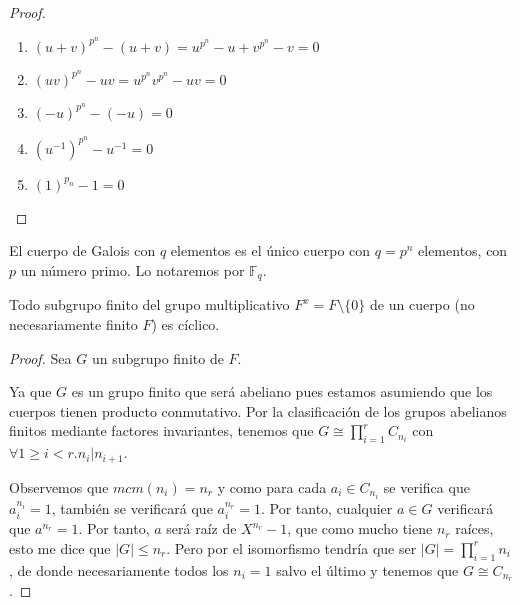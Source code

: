 \begin{proof}
\begin{enumerate}
\item $(u+v)^{p^n} - (u+v) = u^{p^n}-u+v^{p^n}-v = 0$
\item $(uv)^{p^n}-uv = u^{p^n}v^{p^n} - uv = 0$
\item $(-u)^{p^n} - (-u) = 0$
\item $(u^{-1})^{p^n} - u^{-1} = 0$
\item $(1)^{p_n} - 1 = 0$
\end{enumerate}
\end{proof}

\begin{definition}
El cuerpo de Galois con $q$ elementos es el único cuerpo con $q = p^n$ elementos, con $p$ un número primo. Lo notaremos por $\mathbb{F}_q$. 
\end{definition}

\begin{proposition}
	Todo subgrupo finito del grupo multiplicativo $F^x = F \setminus \{0\}$ de un cuerpo (no necesariamente finito $F$) es cíclico. 
\end{proposition}
\begin{proof}
	Sea $G$ un subgrupo finito de $F$. 
	
	Ya que $G$ es un grupo finito que será abeliano pues estamos asumiendo que los cuerpos tienen producto conmutativo. Por la clasificación de los grupos abelianos finitos mediante factores invariantes, tenemos que $G \cong \prod_{i = 1}^r C_{n_i}$ con $\forall 1 \ge i < r. n_i|n_{i+1}$.
	
	Observemos que $mcm(n_i) = n_r$ y como para cada $a_i \in C_{n_i}$ se verifica que $a_i^{n_i} = 1$, también se verificará que $a_i^{n_r} = 1$. Por tanto, cualquier $a \in G$ verificará que $a^{n_r} = 1$. Por tanto, $a$ será raíz de $X^{n_r}-1$, que como mucho tiene $n_r$ raíces, esto me dice que $|G| \le n_r$. Pero por el isomorfismo tendría que ser $|G| = \prod_{i = 1}^r n_i$, de donde necesariamente todos los $n_i = 1$ salvo el último y tenemos que $G \cong C_{n_r}$. 
\end{proof}

